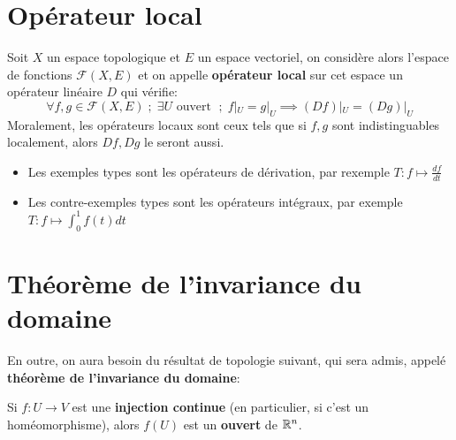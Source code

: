 \section{Opérateur local}
      Soit \( X \) un espace topologique et \( E \) un espace vectoriel, on considère alors l'espace de fonctions \(\mathcal{F}(X, E)\) et on appelle \textbf{opérateur local} sur cet espace un opérateur linéaire \(D\) qui vérifie:
      \[ 
         \forall f, g \in \mathcal{F}(X, E) \; ; \;  \exists U \text{ ouvert } \; ; \; f|_U = g|_U \implies (Df)|_U = (Dg)|_U 
      \]
      Moralement, les opérateurs locaux sont ceux tels que si \( f, g \) sont indistinguables localement, alors \( Df, Dg \) le seront aussi.
      \begin{itemize}
         \item Les exemples types sont les opérateurs de dérivation, par rexemple \(T : f \longmapsto \frac{df}{dt}\)
         \item Les contre-exemples types sont les opérateurs intégraux, par exemple \(T : f \longmapsto \int_0^1 f(t)dt\)
      \end{itemize}

\section{Théorème de l'invariance du domaine}
   En outre, on aura besoin du résultat de topologie suivant, qui sera admis, appelé \textbf{théorème de l'invariance du domaine}:

   \begin{center}
      Si \( f : U \longrightarrow V \) est une \textbf{injection continue} (en particulier, si c'est un homéomorphisme), alors \( f(U) \) est un \textbf{ouvert} de \( \mathbb{R}^n \).
   \end{center}

